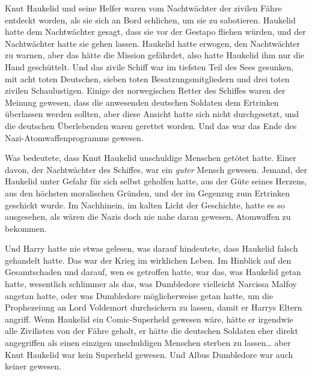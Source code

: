 Knut Haukelid und seine Helfer waren vom Nachtwächter der zivilen Fähre entdeckt worden, als sie sich an Bord schlichen, um sie zu sabotieren. Haukelid hatte dem Nachtwächter gesagt, dass sie vor der Gestapo fliehen würden, und der Nachtwächter hatte sie gehen lassen. Haukelid hatte erwogen, den Nachtwächter zu warnen, aber das hätte die Mission gefährdet, also hatte Haukelid ihm nur die Hand geschüttelt. Und das zivile Schiff war im tiefsten Teil des Sees gesunken, mit acht toten Deutschen, sieben toten Besatzungsmitgliedern und drei toten zivilen Schaulustigen. Einige der norwegischen Retter des Schiffes waren der Meinung gewesen, dass die anwesenden deutschen Soldaten dem Ertrinken überlassen werden sollten, aber diese Ansicht hatte sich nicht durchgesetzt, und die deutschen Überlebenden waren gerettet worden. Und das war das Ende des Nazi-Atomwaffenprogramms gewesen.

Was bedeutete, dass Knut Haukelid unschuldige Menschen getötet hatte. Einer davon, der Nachtwächter des Schiffes, war ein \emph{guter} Mensch gewesen. Jemand, der Haukelid unter Gefahr für sich selbst geholfen hatte, aus der Güte seines Herzens, aus den höchsten moralischen Gründen, und der im Gegenzug zum Ertrinken geschickt wurde.
Im Nachhinein, im kalten Licht der Geschichte, hatte es so ausgesehen, als wären die Nazis doch nie nahe daran gewesen, Atomwaffen zu bekommen.

Und Harry hatte nie etwas gelesen, was darauf hindeutete, dass Haukelid falsch gehandelt hatte.
Das war der Krieg im wirklichen Leben. Im Hinblick auf den Gesamtschaden und darauf, wen es getroffen hatte, war das, was Haukelid getan hatte, wesentlich schlimmer als das, was Dumbledore vielleicht Narcissa Malfoy angetan hatte, oder was Dumbledore möglicherweise getan hatte, um die Prophezeiung an Lord Voldemort durchsickern zu lassen, damit er Harrys Eltern angriff.
Wenn Haukelid ein Comic-Superheld gewesen wäre, hätte er irgendwie alle Zivilisten von der Fähre geholt, er hätte die deutschen Soldaten eher direkt angegriffen
als einen einzigen unschuldigen Menschen sterben zu lassen…
aber Knut Haukelid war kein Superheld gewesen.
Und Albus Dumbledore war auch keiner gewesen.

